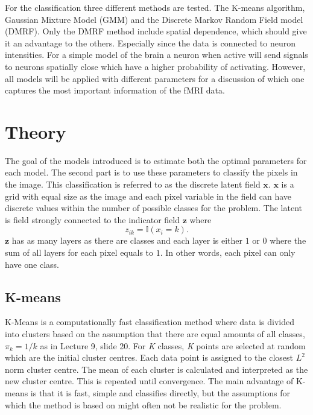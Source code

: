 \documentclass[a4paper,english]{article}
\begin{document}
For the classification three different methods are tested.
The K-means algorithm, Gaussian Mixture Model (GMM) and the Discrete Markov Random Field model (DMRF).
Only the DMRF method include spatial dependence, which should give it an advantage to the others.
Especially since the data is connected to neuron intensities.
For a simple model of the brain a neuron when active will send signals to neurons spatially close which have a higher probability of activating.
However, all models will be applied with different parameters for a discussion of which one captures the most important information of the fMRI data.

\section{Theory}
The goal of the models introduced is to estimate both the optimal parameters for each model.
The second part is to use these parameters to classify the pixels in the image.
This classification is referred to as the discrete latent field $\boldsymbol{x}$.
$\boldsymbol{x}$ is a grid with equal size as the image and each pixel variable in the field can have discrete values within the number of possible classes for the problem.
The latent is field strongly connected to the indicator field $\boldsymbol{z}$ where
\begin{equation}
  z_{ik} = \mathds{I}(x_i = k).
\end{equation}
$\boldsymbol{z}$ has as many layers as there are classes and each layer is either $1$ or $0$ where the sum of all layers for each pixel equals to $1$.
In other words, each pixel can only have one class.

\subsection{K-means}

K-Means is a computationally fast classification method where data is divided into clusters based on the assumption that there are equal amounts of all classes, $\pi_k = 1 / k$ as in Lecture 9, slide 20\cite{L09}. For \textit{K} classes, \textit{K} points are selected at random which are the initial cluster centres. Each data point is assigned to the closest $L^2$ norm cluster centre. The mean of each cluster is calculated and interpreted as the new cluster centre. This is repeated until convergence. The main advantage of K-means is that it is fast, simple and classifies directly, but the assumptions for which the method is based on might often not be realistic for the problem.
\end{document}
